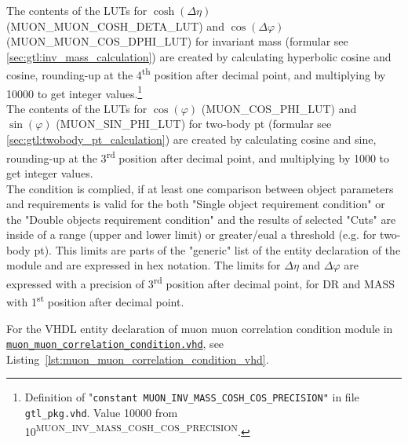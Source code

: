 The contents of the LUTs for $\cosh(\Delta\eta)$ (\small{MUON\_MUON\_COSH\_DETA\_LUT}\normalsize) and $\cos(\Delta\varphi)$ (\small{MUON\_MUON\_COS\_DPHI\_LUT}\normalsize) for invariant mass (formular see \ref{sec:gtl:inv_mass_calculation}) are created by calculating hyperbolic cosine and cosine, rounding-up at the 4\textsuperscript{th} position after decimal point, and multiplying by 10000 to get integer values.\footnote{Definition of "\texttt{constant \small{MUON\_INV\_MASS\_COSH\_COS\_PRECISION}\normalsize"} in file \texttt{gtl\_pkg.vhd}. Value 10000 from 10\textsuperscript{\tiny{MUON\_INV\_MASS\_COSH\_COS\_PRECISION}}\normalsize.}\\
The contents of the LUTs for $\cos(\varphi)$ (\small{MUON\_COS\_PHI\_LUT}\normalsize) and $\sin(\varphi)$ (\small{MUON\_SIN\_PHI\_LUT}\normalsize) for two-body pt 
(formular see \ref{sec:gtl:twobody_pt_calculation}) are created by calculating cosine and sine, rounding-up at the 3\textsuperscript{rd} position after decimal point,
and multiplying by 1000 to get integer values.\\
The condition is complied, if at least one comparison between object parameters and requirements is valid for the both "Single object requirement condition" or the "Double objects requirement condition" and the results of selected "Cuts" are inside of a range (upper and lower limit) or greater/eual a threshold (e.g. for two-body pt).
This limits are parts of the "generic" list of the entity declaration of the module and are expressed in hex notation. The limits for $\Delta\eta$ and $\Delta\varphi$
are expressed with a precision of 3\textsuperscript{rd} position after decimal point, for DR and MASS with 1\textsuperscript{st} position after decimal point.

For the VHDL entity declaration of muon muon correlation condition module in \href{https://github.com/cms-l1-globaltrigger/mp7_ugt_legacy/tree/master/firmware/hdl/gt_mp7_core/gtl_fdl_wrapper/gtl/muon_muon_correlation_condition.vhd}{\texttt{muon\_muon\_correlation\_condition.vhd}}, see Listing~\ref{lst:muon_muon_correlation_condition_vhd}.\\
\clearpage


